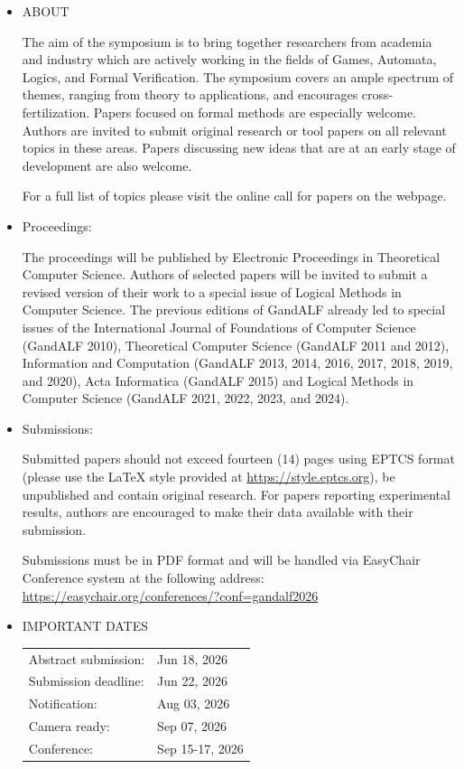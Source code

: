 \documentclass[prodmode,acmtecs]{acmsmall} %
\begin{document}
\begin{itemize}\item  ABOUT  
 
  The aim of the symposium is to bring together researchers from academia and industry which are actively working in the fields of Games, Automata, Logics, and Formal Verification. The symposium covers an ample spectrum of themes, ranging from theory to applications, and encourages cross-fertilization. Papers focused on formal methods are especially welcome. Authors are invited to submit original research or tool papers on all relevant topics in these areas. Papers discussing new ideas that are at an early stage of development are also welcome. 
 
  For a full list of topics please visit the online call for papers on the webpage.  
 
\item  Proceedings: 
 
  The proceedings will be published by Electronic Proceedings in Theoretical Computer Science. Authors of selected papers will be invited to submit a revised version of their work to a special issue of Logical Methods in Computer Science. The previous editions of GandALF already led to special issues of the International Journal of Foundations of Computer Science (GandALF 2010), Theoretical Computer Science (GandALF 2011 and 2012), Information and Computation (GandALF 2013, 2014, 2016, 2017, 2018, 2019, and 2020), Acta Informatica (GandALF 2015) and Logical Methods in Computer Science (GandALF 2021, 2022, 2023, and 2024). 
 
\item  Submissions: 
 
  Submitted papers should not exceed fourteen (14) pages using EPTCS format (please use the LaTeX style provided at \href{https://style.eptcs.org}{https://style.eptcs.org}), be unpublished and contain original research. For papers reporting experimental results, authors are encouraged to make their data available with their submission. 
 
  Submissions must be in PDF format and will be handled via EasyChair Conference system at the following address: \href{https://easychair.org/conferences/?conf=gandalf2026}{https://easychair.org/conferences/?conf=gandalf2026} 
 
\item  IMPORTANT DATES 
 
\begin{tabulary}{\linewidth}{LL}Abstract submission:  & Jun 18, 2026 \\
Submission deadline:  & Jun 22, 2026 \\
Notification:  & Aug 03, 2026 \\
Camera ready:  & Sep 07, 2026 \\
Conference:  & Sep 15-17, 2026 \\
\end{tabulary}
 

\end{itemize}
\end{document}
